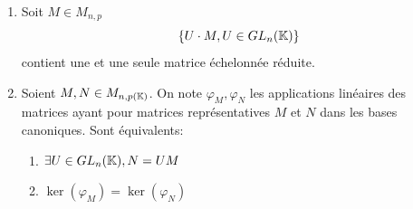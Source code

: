 \documentclass[]{report}
\begin{document}
\begin{tm}{}{}
    \begin{enumerate}
        \item Soit $M\in M_{n,p}$
        \[\left\{ U\cdot M,U\in GL_n(\mathbb{K})\right\}\]
        contient une et une seule matrice échelonnée réduite.
        \item Soient $M,N\in M_{n,p(\mathbb{K})}$. On note $\varphi_M,\varphi_N$ les applications linéaires des matrices ayant pour matrices représentatives $M$ et $N$ dans les bases canoniques. Sont équivalents:
        \begin{enumerate}
            \item $\exists U\in GL_n(\mathbb{K}),N=UM$
            \item $\ker(\varphi_M)=\ker (\varphi_N)$
        \end{enumerate}
    \end{enumerate}
\end{tm}
\end{document}
